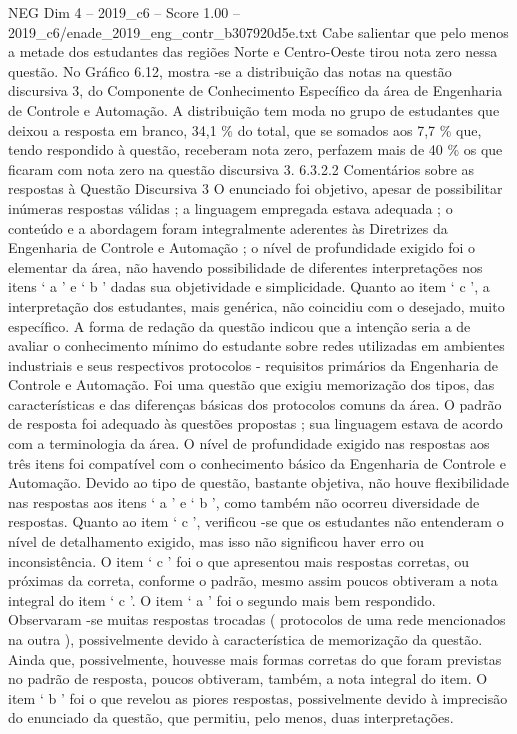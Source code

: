 \begin{textsample}{NEG Dim 4 – 2019\_c6 – Score 1.00 – 2019\_c6/enade\_2019\_eng\_contr\_b307920d5e.txt}
Cabe salientar que pelo menos a metade dos estudantes das regiões Norte e Centro-Oeste tirou nota zero nessa questão.
No Gráfico 6.12, mostra -se a distribuição das notas na questão discursiva 3, do Componente de Conhecimento Específico da área de Engenharia de Controle e Automação.
A distribuição tem moda no grupo de estudantes que deixou a resposta em branco, 34,1 \% do total, que se somados aos 7,7 \% que, tendo respondido à questão, receberam nota zero, perfazem mais de 40 \% os que ficaram com nota zero na questão discursiva 3. 6.3.2.2 Comentários sobre as respostas à Questão Discursiva 3 O enunciado foi objetivo, apesar de possibilitar inúmeras respostas válidas ; a linguagem empregada estava adequada ; o conteúdo e a abordagem foram integralmente aderentes às Diretrizes da Engenharia de Controle e Automação ; o nível de profundidade exigido foi o elementar da área, não havendo possibilidade de diferentes interpretações nos itens ‘ a ’ e ‘ b ’ dadas sua objetividade e simplicidade.
Quanto ao item ‘ c ’, a interpretação dos estudantes, mais genérica, não coincidiu com o desejado, muito específico.
A forma de redação da questão indicou que a intenção seria a de avaliar o conhecimento mínimo do estudante sobre redes utilizadas em ambientes industriais e seus respectivos protocolos - requisitos primários da Engenharia de Controle e Automação.
Foi uma questão que exigiu memorização dos tipos, das características e das diferenças básicas dos protocolos comuns da área.
O padrão de resposta foi adequado às questões propostas ; sua linguagem estava de acordo com a terminologia da área.
O nível de profundidade exigido nas respostas aos três itens foi compatível com o conhecimento básico da Engenharia de Controle e Automação.
Devido ao tipo de questão, bastante objetiva, não houve flexibilidade nas respostas aos itens ‘ a ’ e ‘ b ’, como também não ocorreu diversidade de respostas.
Quanto ao item ‘ c ’, verificou -se que os estudantes não entenderam o nível de detalhamento exigido, mas isso não significou haver erro ou inconsistência.
O item ‘ c ’ foi o que apresentou mais respostas corretas, ou próximas da correta, conforme o padrão, mesmo assim poucos obtiveram a nota integral do item ‘ c ’.
O item ‘ a ’ foi o segundo mais bem respondido.
Observaram -se muitas respostas trocadas ( protocolos de uma rede mencionados na outra ), possivelmente devido à característica de memorização da questão.
Ainda que, possivelmente, houvesse mais formas corretas do que foram previstas no padrão de resposta, poucos obtiveram, também, a nota integral do item.
O item ‘ b ’ foi o que revelou as piores respostas, possivelmente devido à imprecisão do enunciado da questão, que permitiu, pelo menos, duas interpretações.

\end{textsample}
